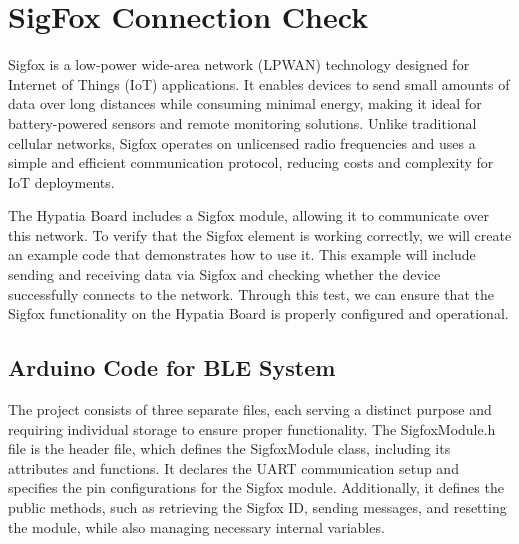 %

\chapter{SigFox Connection Check}
Sigfox is a low-power wide-area network (LPWAN) technology designed for Internet of Things (IoT) applications. It enables devices to send small amounts of data over long distances while consuming minimal energy, making it ideal for battery-powered sensors and remote monitoring solutions. Unlike traditional cellular networks, Sigfox operates on unlicensed radio frequencies and uses a simple and efficient communication protocol, reducing costs and complexity for IoT deployments.

The Hypatia Board includes a Sigfox module, allowing it to communicate over this network. To verify that the Sigfox element is working correctly, we will create an example code that demonstrates how to use it. This example will include sending and receiving data via Sigfox and checking whether the device successfully connects to the network. Through this test, we can ensure that the Sigfox functionality on the Hypatia Board is properly configured and operational.


\section{Arduino Code for BLE System}
The project consists of three separate files, each serving a distinct purpose and requiring individual storage to ensure proper functionality. The SigfoxModule.h file is the header file, which defines the SigfoxModule class, including its attributes and functions. It declares the UART communication setup and specifies the pin configurations for the Sigfox module. Additionally, it defines the public methods, such as retrieving the Sigfox ID, sending messages, and resetting the module, while also managing necessary internal variables.




